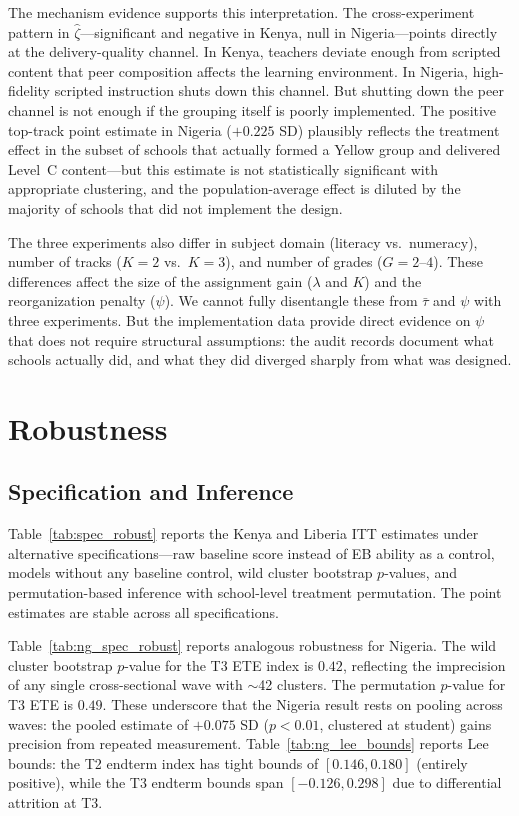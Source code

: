 \documentclass[11pt]{article}
\begin{document}
The mechanism evidence supports this interpretation. The cross-experiment pattern in $\hat{\zeta}$---significant and negative in Kenya, null in Nigeria---points directly at the delivery-quality channel. In Kenya, teachers deviate enough from scripted content that peer composition affects the learning environment. In Nigeria, high-fidelity scripted instruction shuts down this channel. But shutting down the peer channel is not enough if the grouping itself is poorly implemented. The positive top-track point estimate in Nigeria ($+0.225$ SD) plausibly reflects the treatment effect in the subset of schools that actually formed a Yellow group and delivered Level~C content---but this estimate is not statistically significant with appropriate clustering, and the population-average effect is diluted by the majority of schools that did not implement the design.

The three experiments also differ in subject domain (literacy vs.\ numeracy), number of tracks ($K = 2$ vs.\ $K = 3$), and number of grades ($G = 2$--$4$). These differences affect the size of the assignment gain ($\lambda$ and $K$) and the reorganization penalty ($\psi$). We cannot fully disentangle these from $\bar{\tau}$ and $\psi$ with three experiments. But the implementation data provide direct evidence on $\psi$ that does not require structural assumptions: the audit records document what schools actually did, and what they did diverged sharply from what was designed.

\section{Robustness}
\label{sec:robustness}

\subsection{Specification and Inference}

Table~\ref{tab:spec_robust} reports the Kenya and Liberia ITT estimates under alternative specifications---raw baseline score instead of EB ability as a control, models without any baseline control, wild cluster bootstrap $p$-values, and permutation-based inference with school-level treatment permutation. The point estimates are stable across all specifications.

Table~\ref{tab:ng_spec_robust} reports analogous robustness for Nigeria. The wild cluster bootstrap $p$-value for the T3 ETE index is $0.42$, reflecting the imprecision of any single cross-sectional wave with $\sim$42 clusters. The permutation $p$-value for T3 ETE is $0.49$. These underscore that the Nigeria result rests on pooling across waves: the pooled estimate of $+0.075$ SD ($p < 0.01$, clustered at student) gains precision from repeated measurement. Table~\ref{tab:ng_lee_bounds} reports Lee bounds: the T2 endterm index has tight bounds of $[0.146, 0.180]$ (entirely positive), while the T3 endterm bounds span $[-0.126, 0.298]$ due to differential attrition at T3.
\end{document}
